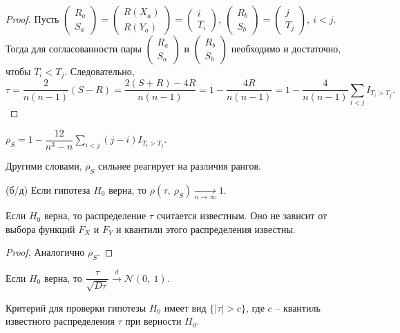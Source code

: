 \begin{proof}
    Пусть $\displaystyle \begin{pmatrix}
    R_{a}\\
    S_{a}
    \end{pmatrix} =\begin{pmatrix}
    R( X_{a})\\
    R( Y_{a})
    \end{pmatrix} =\begin{pmatrix}
    i\\
    T_{i}
    \end{pmatrix} ,\ \begin{pmatrix}
    R_{b}\\
    S_{b}
    \end{pmatrix} =\begin{pmatrix}
    j\\
    T_{j}
    \end{pmatrix} ,\ i< j$. Тогда для согласованности пары $\displaystyle \begin{pmatrix}
    R_{a}\\
    S_{a}
    \end{pmatrix}$ и $\displaystyle \begin{pmatrix}
    R_{b}\\
    S_{b}
    \end{pmatrix}$ необходимо и достаточно, чтобы $\displaystyle T_{i} < T_{j}$. Следовательно,
    \begin{equation*}
        \tau =\dfrac{2}{n( n-1)}( S-R) =\dfrac{2( S+R) -4R}{n( n-1)} =1-\dfrac{4R}{n( n-1)} =1-\dfrac{4}{n( n-1)}\sum _{i< j} I_{T_{i}  >T_{j}} .
    \end{equation*}
\end{proof}
\begin{exercise}
    $\displaystyle \rho _{S} =1-\dfrac{12}{n^{3} -n}\sum _{i< j}( j-i) I_{T_{i}  >T_{j}}$.
\end{exercise}
\begin{note}
    Другими словами, $\displaystyle \rho _{S}$ сильнее реагирует на различия рангов.
\end{note}
\begin{proposition}
    (б/д) Если гипотеза $\displaystyle H_{0}$ верна, то $\displaystyle \rho ( \tau ,\ \rho _{S})\xrightarrow[n\rightarrow \infty ]{} 1$.
\end{proposition}
\begin{proposition}
    Если $\displaystyle H_{0}$ верна, то распределение $\displaystyle \tau $ считается известным. Оно не зависит от выбора функций $\displaystyle F_{X}$ и $\displaystyle F_{Y}$ и квантили этого распределения известны.
\end{proposition}
\begin{proof}
    Аналогично $\displaystyle \rho _{S}$.
\end{proof}
\begin{proposition}
    Если $\displaystyle H_{0}$ верна, то $\displaystyle \dfrac{\tau }{\sqrt{D\tau }}\xrightarrow{d}\mathcal{N}( 0,\ 1)$.
\end{proposition}
Критерий для проверки гипотезы $\displaystyle H_{0}$ имеет вид $\displaystyle \{| \tau |  >c\}$, где $\displaystyle c$ -- квантиль известного распределения $\displaystyle \tau $ при верности $H_0$.